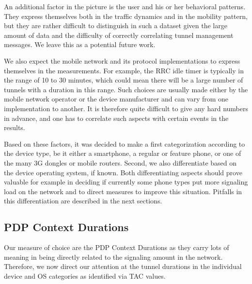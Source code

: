 An additional factor in the picture is the user and his or her behavioral patterns. They express themselves both in the traffic dynamics and in the mobility pattern, but they are rather difficult to distinguish in such a dataset given the large amount of data and the difficulty of correctly correlating tunnel management messages. We leave this as a potential future work.

We also expect the mobile network and its protocol implementations to express themselves in the measurements. For example, the \gls{RRC} idle timer is typically in the range of 10 to 30 minutes, which could mean there will be a large number of tunnels with a duration in this range. Such choices are usually made either by the mobile network operator or the device manufacturer and can vary from one implementation to another. It is therefore quite difficult to give any hard numbers in advance, and one has to correlate such aspects with certain events in the results.

Based on these factors, it was decided to make a first categorization according to the device type, be it either a smartphone, a regular or feature phone, or one of the many 3G dongles or mobile routers. Second, we also differentiate based on the device operating system, if known. Both differentiating aspects should prove valuable for example in deciding if currently some phone types put more signaling load on the network and to direct measures to improve this situation. Pitfalls in this differentiation are described in the next sections.








\subsection{\texorpdfstring{\acrshort{PDP}}{PDP} Context Durations}

Our measure of choice are the PDP Context Durations as they carry lots of meaning in being directly related to the signaling amount in the network. Therefore, we now direct our attention at the tunnel durations in the individual device and OS categories as identified via \gls{TAC} values.


